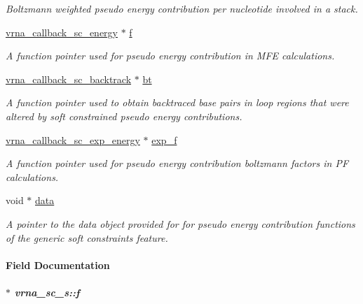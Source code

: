 \begin{DoxyCompactItemize}
\begin{DoxyCompactList}\small\item\em Boltzmann weighted pseudo energy contribution per nucleotide involved in a stack. \end{DoxyCompactList}\item 
\hyperlink{group__soft__constraints_gaf38062858ac25fd5e240c2c3b0b0b780}{vrna\+\_\+callback\+\_\+sc\+\_\+energy} $\ast$ \hyperlink{group__soft__constraints_a32dc86090237888c75491bbd4861a04b}{f}
\begin{DoxyCompactList}\small\item\em A function pointer used for pseudo energy contribution in M\+FE calculations. \end{DoxyCompactList}\item 
\hyperlink{group__soft__constraints_gaa216f513c3b0bd6fe5807dd0c53a8e5a}{vrna\+\_\+callback\+\_\+sc\+\_\+backtrack} $\ast$ \hyperlink{group__soft__constraints_a2a2aca01782c2b980d7b7fd05b9be89c}{bt}
\begin{DoxyCompactList}\small\item\em A function pointer used to obtain backtraced base pairs in loop regions that were altered by soft constrained pseudo energy contributions. \end{DoxyCompactList}\item 
\hyperlink{group__soft__constraints_ga2eade8745c163a553763be4cfe2a679b}{vrna\+\_\+callback\+\_\+sc\+\_\+exp\+\_\+energy} $\ast$ \hyperlink{group__soft__constraints_a0de08a09f3ccf2f97974d23192668ab0}{exp\+\_\+f}
\begin{DoxyCompactList}\small\item\em A function pointer used for pseudo energy contribution boltzmann factors in PF calculations. \end{DoxyCompactList}\item 
void $\ast$ \hyperlink{group__soft__constraints_a7574680143df97b9029146c2150bf06d}{data}\hypertarget{group__soft__constraints_a7574680143df97b9029146c2150bf06d}{}\label{group__soft__constraints_a7574680143df97b9029146c2150bf06d}

\begin{DoxyCompactList}\small\item\em A pointer to the data object provided for for pseudo energy contribution functions of the generic soft constraints feature. \end{DoxyCompactList}\end{DoxyCompactItemize}


\paragraph{Field Documentation}
\subparagraph[{\texorpdfstring{f}{f}}]{$\ast$ vrna\+\_\+sc\+\_\+s\+::f}\hypertarget{group__soft__constraints_a32dc86090237888c75491bbd4861a04b}{}\label{group__soft__constraints_a32dc86090237888c75491bbd4861a04b}


